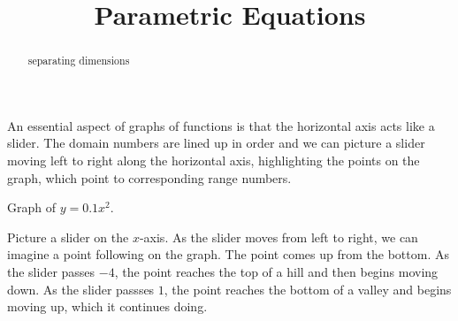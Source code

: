 \documentclass{ximera}
\title{Parametric Equations}
\begin{document}
\begin{abstract}
separating dimensions
\end{abstract}
\maketitle












An essential aspect of graphs of functions is that the horizontal axis acts like a slider.  The domain numbers are lined up in order and we can picture a slider moving left to right along the horizontal axis, highlighting the points on the graph, which point to corresponding range numbers.





Graph of $y = 0.1 x^2$.

\begin{image}
\end{image}


Picture a slider on the $x$-axis.  As the slider moves from left to right, we can imagine a point following on the graph.  The point comes up from the bottom. As the slider passes $-4$, the point reaches the top of a hill and then begins moving down. As the slider passses $1$, the point reaches the bottom of a valley and begins moving up, which it continues doing.
\end{document}
